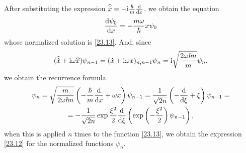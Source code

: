 After substituting the expression $ \widehat{\dot{x}}=-\mathrm{i}\frac{\hbar}{m}\frac{\mathrm{d}}{\mathrm{d} x} $, we obtain the equation
\[ \frac{\mathrm{d} \psi_0}{\mathrm{d} x}=-\frac{m\omega}{\hbar}x\psi_0 \]
whose normalized solution is \eqref{23.13}. And, since
\[ (\widehat{\dot{x}}+\mathrm{i}\omega\widehat{x})\psi_{n-1}=(\dot{x}+\mathrm{i}\omega x)_{n,n-1}\psi_{n}=\mathrm{i}\sqrt{\frac{2\omega\hbar n}{m}}\psi_n, \]
we obtain the recurrence formula
\begin{multline*}
\psi_n=\sqrt{\frac{m}{2\omega\hbar n}}\left(-\frac{\hbar}{m}\frac{\mathrm{d}}{\mathrm{d} x}+\omega x \right)\psi_{n-1}=\frac{1}{\sqrt{2n}}\left(-\frac{\mathrm{d}}{\mathrm{d}\xi}+\xi \right)\psi_{n-1}=\\
=-\frac{1}{\sqrt{2n}}\exp\frac{\xi^2}{2}\frac{\mathrm{d}}{\mathrm{d}\xi}\left(\exp\left(-\frac{\xi^2}{2} \right)\psi_{n-1} \right),
\end{multline*}
when this is applied $ n $ times to the function \eqref{23.13}, we obtain the expression \eqref{23.12} for the normalized functions $\psi_n$.





